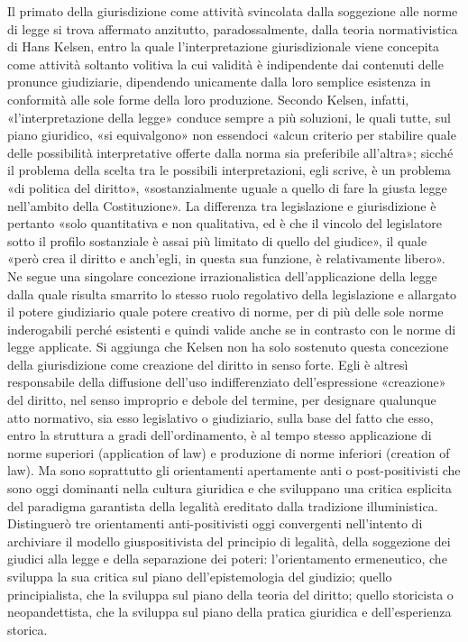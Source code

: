 Il primato della giurisdizione come attività svincolata dalla soggezione alle norme di legge si trova affermato anzitutto, paradossalmente, dalla teoria normativistica di Hans Kelsen, entro la quale l’interpretazione giurisdizionale viene concepita come attività soltanto volitiva la cui validità è indipendente dai contenuti delle pronunce giudiziarie, dipendendo unicamente dalla loro semplice esistenza in conformità alle sole forme della loro produzione. Secondo Kelsen, infatti, «l’interpretazione della legge» conduce sempre a più soluzioni, le quali tutte, sul piano giuridico, «si equivalgono» non essendoci «alcun criterio per stabilire quale delle possibilità interpretative offerte dalla norma sia preferibile all’altra»; sicché il problema della scelta tra le possibili interpretazioni, egli scrive, è un problema «di politica del diritto», «sostanzialmente uguale a quello di fare la giusta legge nell’ambito della Costituzione». La differenza tra legislazione e giurisdizione è pertanto «solo quantitativa e non qualitativa, ed è che il vincolo del legislatore sotto il profilo sostanziale è assai più limitato di quello del giudice», il quale «però crea il diritto e anch’egli, in questa sua funzione, è relativamente libero». Ne segue una singolare concezione irrazionalistica dell’applicazione della legge dalla quale risulta smarrito lo stesso ruolo regolativo della legislazione e allargato il potere giudiziario quale potere creativo di norme, per di più delle sole norme inderogabili perché esistenti e quindi valide anche se in contrasto con le norme di legge applicate. Si aggiunga che Kelsen non ha solo sostenuto questa concezione della giurisdizione come creazione del diritto in senso forte. Egli è altresì responsabile della diffusione dell’uso indifferenziato dell’espressione «creazione» del diritto, nel senso improprio e debole del termine, per designare qualunque atto normativo, sia esso legislativo o giudiziario, sulla base del fatto che esso, entro la struttura a gradi dell’ordinamento, è al tempo stesso applicazione di norme superiori (application of law) e produzione di norme inferiori (creation of law).
Ma sono soprattutto gli orientamenti apertamente anti o post-positivisti che sono oggi dominanti nella cultura giuridica e che sviluppano una critica esplicita del paradigma garantista della legalità ereditato dalla tradizione illuministica. Distinguerò tre orientamenti anti-positivisti oggi convergenti nell’intento di archiviare il modello giuspositivista del principio di legalità, della soggezione dei giudici alla legge e della separazione dei poteri: l’orientamento ermeneutico, che sviluppa la sua critica sul piano dell’epistemologia del giudizio; quello principialista, che la sviluppa sul piano della teoria del diritto; quello storicista o neopandettista, che la sviluppa sul piano della pratica giuridica e dell’esperienza storica.
